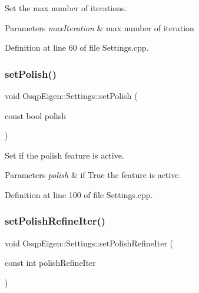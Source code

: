 Set the max number of iterations. 


\begin{DoxyParams}{Parameters}
{\em max\+Iteration} & max number of iteration \\
\hline
\end{DoxyParams}


Definition at line 60 of file Settings.\+cpp.

\mbox{\label{classOsqpEigen_1_1Settings_a64c052c5f72065b5319e152095228859}} 
\subsubsection{\texorpdfstring{set\+Polish()}{setPolish()}}
{\footnotesize\ttfamily void Osqp\+Eigen\+::\+Settings\+::set\+Polish (\begin{DoxyParamCaption}\item[{const bool}]{polish }\end{DoxyParamCaption})}



Set if the polish feature is active. 


\begin{DoxyParams}{Parameters}
{\em polish} & if True the feature is active. \\
\hline
\end{DoxyParams}


Definition at line 100 of file Settings.\+cpp.

\mbox{\label{classOsqpEigen_1_1Settings_aabae74571bfbb2b33ec23b255476fbec}} 
\subsubsection{\texorpdfstring{set\+Polish\+Refine\+Iter()}{setPolishRefineIter()}}
{\footnotesize\ttfamily void Osqp\+Eigen\+::\+Settings\+::set\+Polish\+Refine\+Iter (\begin{DoxyParamCaption}\item[{const int}]{polish\+Refine\+Iter }\end{DoxyParamCaption})}



